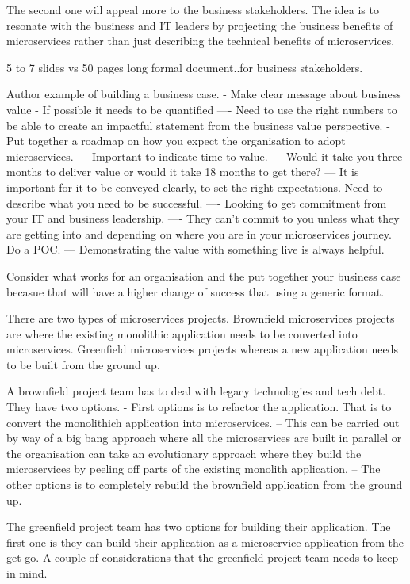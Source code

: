 \documentclass[a4paper, 11pt]{book}
\begin{document}
    The second one will appeal more to the business stakeholders.
    The idea is to resonate with the business and IT leaders by projecting the business benefits of microservices rather than just describing the technical benefits of microservices.

    5 to 7 slides vs 50 pages long formal document..for business stakeholders.

    Author example of building a business case.
    - Make clear message about business value
    - If possible it needs to be quantified
    ---- Need to use the right numbers to be able to create an impactful statement from the business value perspective.
    - Put together a roadmap on how you expect the organisation to adopt microservices.
    --- Important to indicate time to value.
    --- Would it take you three months to deliver value or would it take 18 months to get there?
    --- It is important for it to be conveyed clearly, to set the right expectations. Need to describe what you need to be successful.
    ---- Looking to get commitment from your IT and business leadership.
    ---- They can't commit to you unless what they are getting into and depending on where you are in your microservices journey. Do a POC.
    --- Demonstrating the value with something live is always helpful.

    Consider what works for an organisation and the put together your business case becasue that will have a higher change of success that using a generic format.


    There are two types of microservices projects.
    Brownfield microservices projects are where the existing monolithic application needs to be converted into microservices.
    Greenfield microservices projects whereas a new application needs to be built from the ground up.

    A brownfield project team has to deal with legacy technologies and tech debt. They have two options.
    - First options is to refactor the application. That is to convert the monolithich application into microservices.
    -- This can be carried out by way of a big bang approach where all the microservices are built in parallel or the organisation can take an evolutionary approach where they build the microservices by peeling off parts of the existing monolith application.
    -- The other options is to completely rebuild the brownfield application from the ground up.

    The greenfield project team has two options for building their application.
    The first one is they can build their application as a microservice application from the get go.
    A couple of considerations that the greenfield project team needs to keep in mind.
\end{document}
